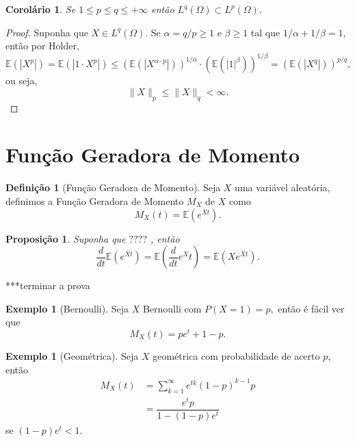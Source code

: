 \documentclass[12pt,a4paper,oneside]{book}
\newtheorem{proposition}[theorem]{Proposi\c{c}\~ao}
\newtheorem{corollary}[theorem]{Corol\'ario}
\theoremstyle{definition}
\newtheorem{definition}[theorem]{Defini\c{c}\~ao}
\newtheorem{example}[theorem]{Exemplo}
\theoremstyle{remark}
\numberwithin{equation}{section}
\newcommand{\E}{\mathbb{E}}
\begin{document}
\begin{corollary}
Se $1 \leq p\leq q\leq +\infty$ então $L^q(\Omega)\subset L^p(\Omega).$ 
\end{corollary}
\begin{proof}
Suponha que $X\in L^q(\Omega)$. Se $\alpha = q/p \geq 1$ e $\beta\geq 1$ tal que $1/\alpha+1/\beta = 1$, então por Holder, 
$$\E(|X^p|)=\E(|1\cdot X^p|) \leq (\E(|X^{\alpha\cdot p}|))^{1/\alpha}\cdot (\E(|1|^{\beta}))^{1/\beta} = (\E(|X^q|))^{p/q},$$
ou seja,
$$\|X\|_p \leq \|X\|_q<\infty. $$
\end{proof}












\newpage
\section{Função Geradora de Momento}\label{sec-geradora-momento}


\begin{definition}[Função Geradora de Momento]
Seja $X$ uma variável aleatória, definimos a Função Geradora de Momento $M_X$ de $X$ como
$$M_X(t) = \E(e^{Xt}). $$
\end{definition}


\begin{proposition}
Suponha que $????$ , então
$$\dfrac{d }{dt}\E(e^{Xt}) =\E\left(\dfrac{d}{dt}e^Xt\right) =  \E(Xe^{Xt}). $$
\end{proposition}
***terminar a prova

\begin{example}[Bernoulli]
Seja $X$ Bernoulli com $P(X=1) = p,$ então é fácil ver que
$$M_X(t) = pe^t + 1 - p. $$
\end{example}

\begin{example}[Geométrica]
Seja $X$ geométrica com probabilidade de acerto $p$, então 
\begin{align*}
M_X(t)  &= \sum_{k=1}^\infty e^{tk}(1-p)^{k-1}p\\
		&= \dfrac{e^t p }{1-(1-p)e^t}
\end{align*}
se $(1-p)e^t<1.$
\end{example}
\end{document}
